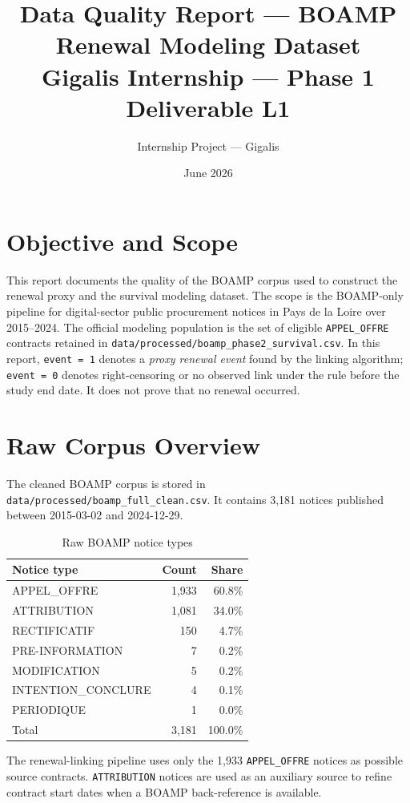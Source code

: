 \documentclass[11pt,a4paper]{article}
\title{\textbf{Data Quality Report --- BOAMP Renewal Modeling Dataset}\\[0.3em]
\large Gigalis Internship --- Phase 1 Deliverable L1}
\author{Internship Project --- Gigalis}
\date{June 2026}
\begin{document}
\maketitle

\section{Objective and Scope}

This report documents the quality of the BOAMP corpus used to construct the
renewal proxy and the survival modeling dataset. The scope is the BOAMP-only
pipeline for digital-sector public procurement notices in Pays de la Loire over
2015--2024. The official modeling population is the set of eligible
\texttt{APPEL\_OFFRE} contracts retained in
\texttt{data/processed/boamp\_phase2\_survival.csv}. In this report,
\texttt{event = 1} denotes a \emph{proxy renewal event} found by the linking
algorithm; \texttt{event = 0} denotes right-censoring or no observed link under
the rule before the study end date. It does not prove that no renewal occurred.

\section{Raw Corpus Overview}

The cleaned BOAMP corpus is stored in
\texttt{data/processed/boamp\_full\_clean.csv}. It contains 3{,}181 notices
published between 2015-03-02 and 2024-12-29.

\begin{table}[H]
\centering
\caption{Raw BOAMP notice types}
\small
\begin{tabular}{lrr}
\toprule
Notice type & Count & Share \\
\midrule
APPEL\_OFFRE & 1{,}933 & 60.8\% \\
ATTRIBUTION & 1{,}081 & 34.0\% \\
RECTIFICATIF & 150 & 4.7\% \\
PRE-INFORMATION & 7 & 0.2\% \\
MODIFICATION & 5 & 0.2\% \\
INTENTION\_CONCLURE & 4 & 0.1\% \\
PERIODIQUE & 1 & 0.0\% \\
\midrule
Total & 3{,}181 & 100.0\% \\
\bottomrule
\end{tabular}
\end{table}

The renewal-linking pipeline uses only the 1{,}933 \texttt{APPEL\_OFFRE}
notices as possible source contracts. \texttt{ATTRIBUTION} notices are used as
an auxiliary source to refine contract start dates when a BOAMP back-reference
is available.
\end{document}
